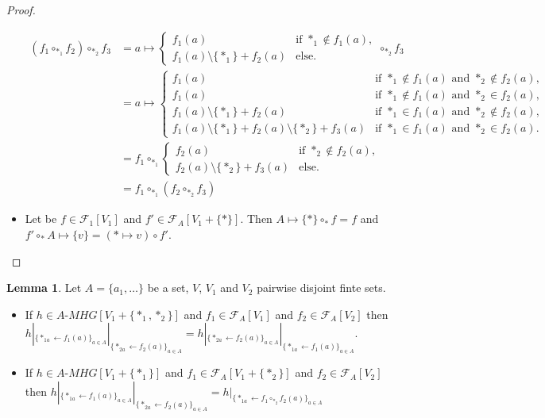 \documentclass[a4paper]{article}
\theoremstyle{definition}
\newtheorem{lemma}[definition]{Lemma}
\begin{document}
\begin{proof}
\begin{itemize}
\begin{align*}
(f_1\circ_{\ast_1} f_2)\circ_{\ast_2} f_3 &= a\mapsto\left\{\begin{array}{cl}
f_1(a)  & \text{if $\ast_1\not\in f_1(a)$},    \\ 
f_1(a)\setminus\{\ast_1\} + f_2(a)  & \text{else.}\end{array}\right. \circ_{\ast_2} f_3 \\
&= a\mapsto\left\{\begin{array}{cl}
f_1(a)  & \text{if $\ast_1\not\in f_1(a)$ and $\ast_2\not\in f_2(a)$},    \\
f_1(a)  & \text{if $\ast_1\not\in f_1(a)$ and $\ast_2\in f_2(a)$},    \\ 
f_1(a)\setminus\{\ast_1\} + f_2(a)  & \text{if $\ast_1\in f_1(a)$ and $\ast_2\not\in f_2(a)$},    \\ 
f_1(a)\setminus\{\ast_1\} + f_2(a)\setminus\{\ast_2\} + f_3(a)  & \text{if $\ast_1\in f_1(a)$ and $\ast_2\in f_2(a)$}.\end{array}\right. \\
&= f_1\circ_{\ast_1} \left\{\begin{array}{cl}
f_2(a)  & \text{if $\ast_2\not\in f_2(a)$},    \\ 
f_2(a)\setminus\{\ast_2\} + f_3(a)  & \text{else.}\end{array}\right. \\
&= f_1\circ_{\ast_1}(f_2\circ_{\ast_2} f_3)
\end{align*}
\item Let be $f\in \mathcal{F}_1[V_1]$ and $f'\in\mathcal{F}_A[V_1+\{\ast\}]$. Then $A\mapsto\{\ast\}\circ_{\ast} f= f$ and $f'\circ_{\ast} A\mapsto \{v\}= (\ast\mapsto v )\circ f'$.
\end{itemize}
\end{proof}

\begin{lemma}
\label{oppol}
Let $A=\{a_1,\dots\}$ be a set, $V$, $V_1$ and $V_2$ pairwise disjoint finte sets.
\begin{itemize}
\item If $h\in A\text{-}MHG[V_1+\{\ast_1,\ast_2\}]$ and $f_1\in \mathcal{F}_A[V_1]$ and $f_2\in \mathcal{F}_A[V_2]$ then $h|_{\{\ast_{1a}\leftarrow f_1(a)\}_{a\in A}}|_{\{\ast_{2a}\leftarrow f_2(a)\}_{a\in A}} = h|_{\{\ast_{2a}\leftarrow f_2(a)\}_{a\in A}}|_{\{\ast_{1a}\leftarrow f_1(a)\}_{a\in A}}$.
\item If $h\in A\text{-}MHG[V_1+\{\ast_1\}]$ and $f_1\in \mathcal{F}_A[V_1+\{\ast_2\}]$ and $f_2\in \mathcal{F}_A[V_2]$ then $h|_{\{\ast_{1a}\leftarrow f_1(a)\}_{a\in A}}|_{\{\ast_{2a}\leftarrow f_2(a)\}_{a\in A}} = h|_{\{\ast_{1a}\leftarrow f_1\circ_{\ast_2} f_2(a)\}_{a\in A}}$
\end{itemize}
\end{lemma}
\end{document}
